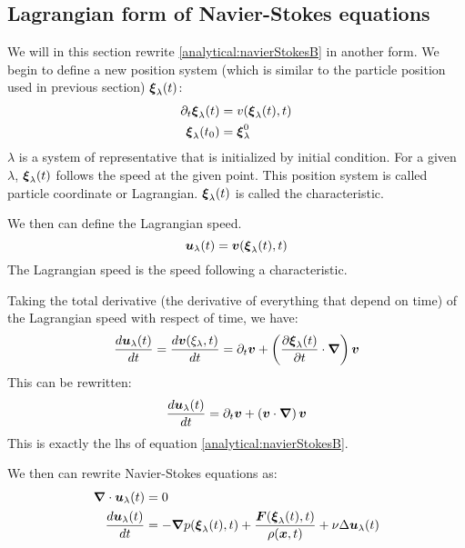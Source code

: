 \subsection{Lagrangian form of Navier-Stokes equations}
\label{analytical:convectif}
We will in this section rewrite \ref{analytical:navierStokesB} in another form.
We begin to define a new position system (which is similar to the particle position used in previous section) ${\boldsymbol {\xi}}_{\lambda}(t)$:
\begin{subequations}
\begin{align}
 \partial_t {\boldsymbol {\xi}}_{\lambda}(t)&=v({\boldsymbol {\xi}}_{\lambda}(t),t)\\
 {\boldsymbol {\xi}}_{\lambda}(t_0)&={\boldsymbol {\xi}}^{0}_{\lambda}
\end{align}
\end{subequations}
$\lambda$ is a system of representative that is initialized by initial condition.
For a given $\lambda$, ${\boldsymbol {\xi}}_{\lambda}(t)$ follows the speed at the given point.
This position system is called particle coordinate or Lagrangian.
${\boldsymbol {\xi}}_\lambda(t)$ is called the characteristic.

We then can define the Lagrangian speed.
\begin{equation}
 {\boldsymbol {u}}_{\lambda}(t)={\boldsymbol {v}}({\boldsymbol {\xi}}_{\lambda}(t),t)
\end{equation}
The Lagrangian speed is the speed following a characteristic.

Taking the total derivative (the derivative of everything that depend on time) of the Lagrangian speed with respect of time, we have:
\begin{equation}
\frac{d {\boldsymbol {u}}_{\lambda}(t)}{d t}=\frac{d {\boldsymbol {v}}(\xi_{\lambda},t)}{d t}=\partial_t {\boldsymbol {v}}+\left(\frac{\partial {\boldsymbol {\xi}}_{\lambda}(t)}{\partial t}\cdot{\boldsymbol {\nabla}}\right){\boldsymbol {v}}
\end{equation}
This can be rewritten:
\begin{equation}
\frac{d {\boldsymbol {u}}_{\lambda}(t)}{d t}=\partial_t {\boldsymbol {v}}+\left({\boldsymbol {v}} \cdot{\boldsymbol {\nabla}}\right){\boldsymbol {v}}
\end{equation}
This is exactly the lhs of equation \ref{analytical:navierStokesB}.

We then can rewrite Navier-Stokes equations as:
\begin{subequations}
\begin{align}
\label{analytical:navierStokesLagA}
{\boldsymbol {\nabla}} \cdot {\boldsymbol {u}}_{\lambda}(t)&=0\\
\label{analytical:navierStokesLagB}
\frac{d {\boldsymbol {u}}_{\lambda}(t)}{d t}&=-{\boldsymbol {\nabla}} p({\boldsymbol {\xi}}_{\lambda}(t),t)+\frac{{\boldsymbol {F}}({\boldsymbol {\xi}}_{\lambda}(t),t)}{\rho({\boldsymbol {x}},t)}+\nu \Delta {\boldsymbol {u}}_{\lambda}(t)
\end{align}
\end{subequations}

